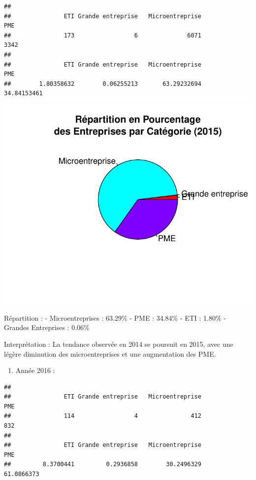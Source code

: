 \documentclass[mstat,12pt]{unswthesis}
\begin{document}
\begin{verbatim}
## 
##               ETI Grande entreprise   Microentreprise               PME 
##               173                 6              6071              3342 
## 
##               ETI Grande entreprise   Microentreprise               PME 
##        1.80358632        0.06255213       63.29232694       34.84153461
\end{verbatim}

\includegraphics{TDDT_projet_L_2_files/figure-latex/analyse_univariee_2015-1.pdf}

\medskip

Répartition : - Microentreprises : 63.29\% - PME : 34.84\% - ETI :
1.80\% - Grandes Entreprises : 0.06\%

Interprétation : La tendance observée en 2014 se poursuit en 2015, avec
une légère diminution des microentreprises et une augmentation des PME.

\medskip

\begin{enumerate}
\def\labelenumi{\arabic{enumi})}
\setcounter{enumi}{5}
\tightlist
\item
  Année 2016 :
\end{enumerate}

\begin{verbatim}
## 
##               ETI Grande entreprise   Microentreprise               PME 
##               114                 4               412               832 
## 
##               ETI Grande entreprise   Microentreprise               PME 
##         8.3700441         0.2936858        30.2496329        61.0866373
\end{verbatim}
\end{document}
